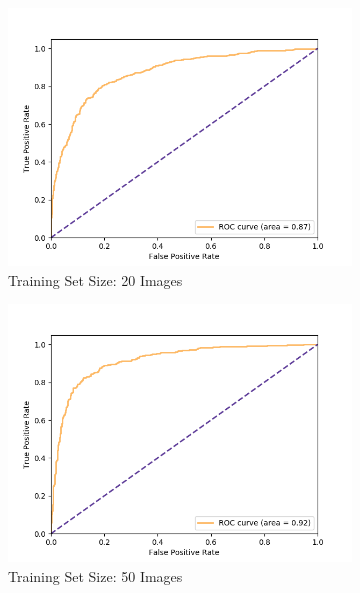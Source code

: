 \begin{figure}[!h]
  \centering
    \begin{subfigure}{.48\textwidth}
        \includegraphics[width=\textwidth]{images/score-10-roc.png}
        \caption{Training Set Size: 20 Images}
    \end{subfigure}
    \begin{subfigure}{.48\textwidth}
        \includegraphics[width=\textwidth]{images/score-25-roc.png}
        \caption{Training Set Size: 50 Images}
    \end{subfigure}
    \begin{subfigure}{.48\textwidth}

\end{subfigure}
\end{figure}
